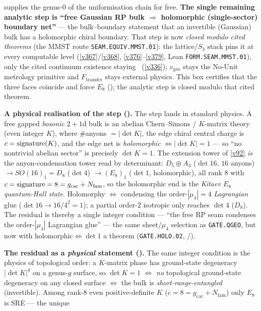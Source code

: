 \documentclass[11pt,a4paper]{article}
\newcommand{\Nfam}{N_{\mathrm{fam}}}
\newcommand{\gcar}{g_{\mathrm{car}}}
\begin{document}
\begin{keybox}
supplies the genus-$0$ of the uniformisation chain for free. \textbf{The single remaining analytic step is
``free Gaussian RP bulk $\Rightarrow$ holomorphic (single-sector) boundary net''} --- the bulk--boundary
statement that an invertible (Gaussian) bulk has a holomorphic chiral boundary. That step is now \emph{closed
modulo cited theorems} (the MMST route \texttt{SEAM.EQUIV.MMST.01}): the lattice/$S_3$ stack pins it at every
computable level (\vref{v367}/\vref{v368},
\vref{v376}--\vref{v379}, Lean \texttt{FORM.SEAM.MMST.01}), only the cited continuum existence staying \mO\
(\vref{v336}); $v_{\mathrm{geo}}$ stays the No-Unit metrology primitive and
$F_{\mathrm{transfer}}$ stays external physics. This box certifies that the three faces coincide and
force $E_8$ (\mE); the analytic step is closed modulo that cited theorem.
\par\smallskip\noindent\textbf{A physical realisation of the step ().}
The step lands in standard physics. A free gapped \emph{bosonic} $2{+}1$d bulk is an abelian
Chern--Simons / $K$-matrix theory (even integer $K$), where $\#$anyons $=|\det K|$, the edge chiral central
charge is $c={\rm signature}(K)$, and the edge net is \emph{holomorphic} $\Leftrightarrow|\det K|=1$ --- so
``no nontrivial abelian sector'' is precisely $\det K=1$. The extension tower of \vref{v92} \emph{is} the
anyon-condensation tower read by determinant: $D_5{\oplus}A_3$ ($\det16$, $16$ anyons) $\to SO(16)_1{=}D_8$
($\det4$) $\to (E_8)_1$ ($\det1$, holomorphic), all rank $8$ with $c={\rm signature}=8=\gcar+\Nfam$, so the
holomorphic end is the \emph{Kitaev $E_8$ quantum-Hall state}. Holomorphy $\Leftrightarrow$ condensing the
order-$|\mu_4|=4$ \emph{Lagrangian} glue ($\det16{\to}16/4^2{=}1$); a partial order-$2$ isotropic only
reaches $\det4$ ($D_8$). The residual is thereby a single integer condition --- ``the free RP seam condenses
the order-$|\mu_4|$ Lagrangian glue'' --- the same sheet/$\mu_4$ selection as \texttt{GATE.QGEO}, but now with
$\text{holomorphic}\Leftrightarrow\det1$ a theorem (\texttt{GATE.HOLO.02}, \mE/\mO).
\par\smallskip\noindent\textbf{The residual as a \emph{physical} statement ().}
The same integer condition is the physics of topological order: a $K$-matrix phase has ground-state
degeneracy $|\det K|^g$ on a genus-$g$ surface, so $\det K=1$ $\Leftrightarrow$ \emph{no} topological
ground-state degeneracy on any closed surface $\Leftrightarrow$ the bulk is \emph{short-range-entangled}
(invertible). Among rank-$8$ even positive-definite $K$ ($c=8=\gcar+\Nfam$) only $E_8$ is SRE --- the unique

\end{keybox}
\end{document}
